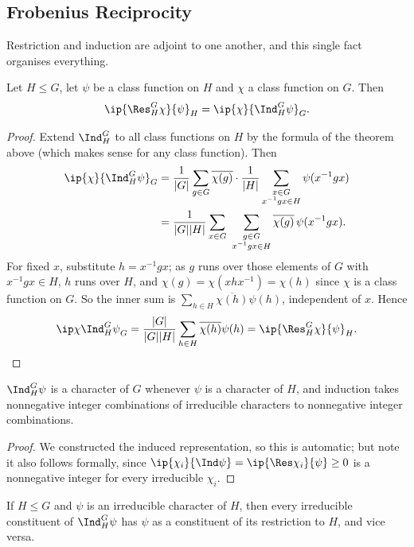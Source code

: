 \subsection{Frobenius Reciprocity}

Restriction and induction are adjoint to one another, and this single fact organises everything.

\begin{theorem}
	Let $H\leq G$, let $\psi$ be a class function on $H$ and $\chi$ a class function on $G$. Then
	$$\ip{\Res^G_H\chi}{\psi}_H = \ip{\chi}{\Ind_H^G\psi}_G.$$
\end{theorem}
\begin{proof}
	Extend $\Ind_H^G$ to all class functions on $H$ by the formula of the theorem above (which makes sense for any class function). Then
	\begin{align*}
		\ip{\chi}{\Ind_H^G\psi}_G &= \frac1{|G|}\sum_{g\in G}\overline{\chi(g)}\cdot\frac1{|H|}\sum_{\substack{x\in G\\x^{-1}gx\in H}}\psi(x^{-1}gx)\\
		&= \frac1{|G||H|}\sum_{x\in G}\ \sum_{\substack{g\in G\\ x^{-1}gx\in H}}\overline{\chi(g)}\,\psi(x^{-1}gx).
	\end{align*}
	For fixed $x$, substitute $h = x^{-1}gx$; as $g$ runs over those elements of $G$ with $x^{-1}gx\in H$, $h$ runs over $H$, and $\chi(g) = \chi(xhx^{-1}) = \chi(h)$ since $\chi$ is a class function on $G$. So the inner sum is $\sum_{h\in H}\overline{\chi(h)}\psi(h)$, independent of $x$. Hence
	$$\ip\chi{\Ind_H^G\psi}_G = \frac{|G|}{|G||H|}\sum_{h\in H}\overline{\chi(h)}\psi(h) = \ip{\Res^G_H\chi}{\psi}_H. \qedhere$$
\end{proof}

\begin{corollary}
	$\Ind_H^G\psi$ is a character of $G$ whenever $\psi$ is a character of $H$, and induction takes nonnegative integer combinations of irreducible characters to nonnegative integer combinations.
\end{corollary}
\begin{proof}
	We constructed the induced representation, so this is automatic; but note it also follows formally, since $\ip{\chi_i}{\Ind\psi} = \ip{\Res\chi_i}{\psi} \geq 0$ is a nonnegative integer for every irreducible $\chi_i$.
\end{proof}

\begin{corollary}
	If $H \leq G$ and $\psi$ is an irreducible character of $H$, then every irreducible constituent of $\Ind_H^G\psi$ has $\psi$ as a constituent of its restriction to $H$, and vice versa.
\end{corollary}

